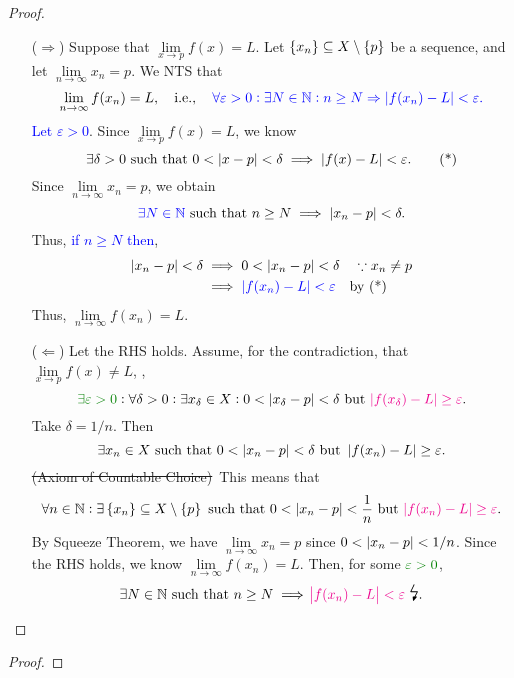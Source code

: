 \documentclass[11pt,openany]{article}
\begin{document}
\begin{proof}
\begin{itemize}
	\item[($\Rightarrow$)] Suppose that $\lim\limits_{x\to p}f(x)=L$. Let $\set{x_n}\subseteq X\setminus\set{p}$ be a sequence, and let $\lim\limits_{n\to\infty}x_n=p$. We NTS that \[
	\lim\limits_{n\to\infty}f(x_n)=L,\quad\textnormal{i.e.},\color{blue}\quad\forall\varepsilon>0:\exists N\in\mathbb{N}:n\geq N\Rightarrow\abs[0]{f(x_n)-L}<\varepsilon.
	\] \textcolor{blue}{Let $\varepsilon>0$}. Since $\lim\limits_{x\to p}f(x)=L$, we know \begin{equation*}
		\exists\delta>0\ \text{such that}\ 0<\abs[0]{x-p}<\delta\implies\abs[0]{f(x)-L}<\varepsilon.\tag{*}
	\end{equation*} Since $\lim\limits_{n\to\infty}x_n=p$, we obtain \[
	\textcolor{blue}{\exists N\in\N}\ \text{such that}\ n\geq N\implies\abs[0]{x_n-p}<\delta.
	\] Thus, \textcolor{blue}{if $n\geq N$ then}, \begin{align*}
		\abs[0]{x_n-p}<\delta&\implies 0<\abs[0]{x_n-p}<\delta\quad\because x_n\neq p \\
		&\implies\textcolor{blue}{\abs[0]{f(x_n)-L}<\varepsilon}\quad\text{by (*)}
	\end{align*} Thus, $\lim\limits_{n\to\infty}f(x_n)=L$.
	\item[($\Leftarrow$)] Let the RHS holds. Assume, for the contradiction, that $\lim\limits_{x\to p} f(x)\neq L$, \ie, \[
	\textcolor{green!50!black}{\exists\varepsilon>0}:\forall\delta>0:\exists x_\delta\in X:0<\abs[0]{x_\delta-p}<\delta\ \text{but}\ \textcolor{magenta}{\abs[0]{f(x_\delta)-L}\geq\varepsilon}.
	\] Take $\delta=1/n$. Then \[
	\exists x_n\in X\ \text{such that}\ 0<\abs[0]{x_n-p}<\delta\ \text{but}\ \abs[0]{f(x_n)-L}\geq \varepsilon.
	\] \textcolor{gray!50}{\st{(Axiom of Countable Choice)}}\ This means that \[
	\forall n\in\N:\exists\set{x_n}\subseteq X\setminus\set{p}\ \text{such that}\ 0<\abs[0]{x_n-p}<\frac{1}{n}\ \text{but}\ \textcolor{magenta}{\abs[0]{f(x_n)-L}\geq \varepsilon}.
	\] By Squeeze Theorem, we have $\lim\limits_{n\to\infty}x_n=p$ since $0<\abs[0]{x_n-p}<1/n$. Since the RHS holds, we know $\lim\limits_{n\to\infty}f(x_n)=L$. Then, for some $\textcolor{green!50!black}{\varepsilon>0}$, \[
	\exists N\in\N\ \text{such that}\ n\geq N\implies\textcolor{magenta}{\abs{f(x_n)-L}<\varepsilon}\ \text{\Large\lightning}.
	\]
\end{itemize}
\end{proof}
\begin{proof}
	
\end{proof}
\end{document}
